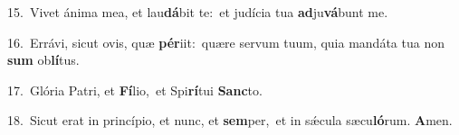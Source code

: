 {\numbfont\textcolor{\numbcolor}{15.}}~Vivet ánima mea, et lau\-\textbf{dá}\-bit te:~\star et judícia tua \textbf{ad}\-ju\-\textbf{vá}\-bunt me.\par
{\numbfont\textcolor{\numbcolor}{16.}}~Errávi, sicut ovis, quæ \textbf{pér}\-iit:~\star quære servum tuum, quia mandáta tua non \textbf{sum} ob\-\textbf{lí}\-tus.\par
{\numbfont\textcolor{\numbcolor}{17.}}~Glória Patri, et \textbf{Fí}\-lio,~\star et Spi\-\textbf{rí}\-tui \textbf{Sanc}\-to.\par
{\numbfont\textcolor{\numbcolor}{18.}}~Sicut erat in princípio, et nunc, et \textbf{sem}\-per,~\star et in sǽcula sæcu\-\textbf{ló}\-rum. \textbf{A}\-men.\par
